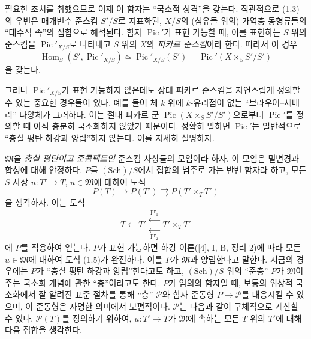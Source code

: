 \documentclass[11pt,twoside,openany]{book}
\numberwithin{equation}{section}
\newcommand{\sourceunit}{front}
\newcommand{\src}[1]{%
  \phantomsection\hypertarget{src:\sourceunit:#1}{}%
  \marginpar{\raggedleft\footnotesize\sffamily #1}%
}
\theoremstyle{plain}
\theoremstyle{definition}
\theoremstyle{remark}
\begin{document}
\src{144}
필요한 조치를 취했으므로 이제 이 함자는 “국소적 성격”을 갖는다.
직관적으로 (1.3)의 우변은 매개변수 준스킴 $S'/S$로 지표화된, $X/S$의
(섬유들 위의) 가역층 동형류들의 “대수적 족”의 집합으로 해석된다. 함자
$\operatorname{Pic}'$가 표현 가능할 때, 이를 표현하는 $S$ 위의 준스킴을
$\operatorname{Pic}'_{X/S}$로 나타내고 $S$ 위의 $X$의
\emph{피카르 준스킴}이라 한다. 따라서 이 경우
\begin{equation}
\operatorname{Hom}_S(S',\operatorname{Pic}'_{X/S})
\simeq\operatorname{Pic}'_{X/S}(S')
=\operatorname{Pic}'(X\times_S S'/S')
\tag{1.4}
\end{equation}
을 갖는다.

그러나 $\operatorname{Pic}'_{X/S}$가 표현 가능하지 않은데도 상대 피카르
준스킴을 자연스럽게 정의할 수 있는 중요한 경우들이 있다. 예를 들어 체
$k$ 위에 $k$-유리점이 없는 “브라우어--세베리” 다양체가 그러하다. 이는
절대 피카르 군 $\operatorname{Pic}(X\times_S S'/S')$으로부터
$\operatorname{Pic}'$를 정의할 때 아직 충분히 국소화하지 않았기
때문이다. 정확히 말하면 $\operatorname{Pic}'$는 일반적으로 “충실 평탄
하강과 양립”하지 않는다. 이를 자세히 설명하자.

$\mathfrak M$을 \emph{충실 평탄이고 준콤팩트인} 준스킴 사상들의 모임이라
하자. 이 모임은 밑변경과 합성에 대해 안정하다. $P$를
$(\mathrm{Sch})/S$에서 집합의 범주로 가는 반변 함자라 하고, 모든
$S$-사상 $u:T'\longrightarrow T$, $u\in\mathfrak M$에 대하여 도식
\begin{equation}
P(T)\longrightarrow P(T')\rightrightarrows P(T'\times_TT')
\tag{1.5}
\end{equation}
을 생각하자. 이는 도식
\[
T\longleftarrow T'\mathrel{\substack{\xleftarrow{\,\mathrm{pr}_1\,}\\[-0.35ex]
\xleftarrow[\,\mathrm{pr}_2\,]{}}}T'\times_TT'
\]
에 $P$를 적용하여 얻는다. $P$가 표현 가능하면 하강 이론([4], I, B,
정리 2)에 따라 모든 $u\in\mathfrak M$에 대하여 도식 (1.5)가 완전하다.
이를 $P$가 $\mathfrak M$과 양립한다고 말한다. 지금의 경우에는 $P$가
“충실 평탄 하강과 양립”한다고도 하고, $(\mathrm{Sch})/S$ 위의 “준층”
$P$가 $\mathfrak M$이 주는 국소화 개념에 관한 “층”이라고도 한다. $P$가
임의의 함자일 때, 보통의 위상적 국소화에서 잘 알려진 표준 절차를 통해
“층” $\mathcal P$와 함자 준동형 $P\longrightarrow\mathcal P$를 대응시킬
수 있으며, 이 준동형은 자명한 의미에서 보편적이다. $\mathcal P$는 다음과
같이 구체적으로 계산할 수 있다. $\mathcal P(T)$를 정의하기 위하여,
$u:T'\longrightarrow T$가 $\mathfrak M$에 속하는 모든 $T$ 위의 $T'$에
대해 다음 집합을 생각한다.
\end{document}
